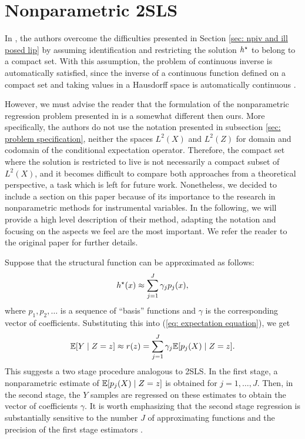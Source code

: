 \section{Nonparametric 2SLS}

In \cite{newey2003}, the authors overcome the difficulties presented in Section \ref{sec: npiv and ill posed lip} by assuming identification and restricting the solution $ h^{ \star } $ to belong to a compact set.
With this assumption, the problem of continuous inverse is automatically satisfied, since the inverse of a continuous function defined on a compact set and taking values in a Hausdorff space is automatically continuous \cite{munkres2000}.

However, we must advise the reader that the formulation of the nonparametric regression problem presented in \cite{newey2003} is a somewhat different then ours.
More specifically, the authors do not use the notation presented in subsection \ref{sec: problem specification}, neither the spaces $ L^2 ( X ) $ and $ L^2 ( Z ) $ for domain and codomain of the conditional expectation operator.
Therefore, the compact set where the solution is restricted to live is not necessarily a compact subset of $ L^{ 2 } ( X ) $, and it becomes difficult to compare both approaches from a theoretical perspective, a task which is left for future work.
Nonetheless, we decided to include a section on this paper because of its importance to the research in nonparametric methods for instrumental variables.
In the following, we will provide a high level description of their method, adapting the notation and focusing on the aspects we feel are the most important.
We refer the reader to the original paper for further details.

Suppose that the structural function can be approximated as follows:
\begin{equation}
    \label{eq: expansion on basis functions}
    h^{ \star } ( x ) \approx \sum_{ j=1 }^{ J } \gamma_{ j } p_{ j } ( x )
,\end{equation}
where $ p_{ 1 }, p_{ 2 }, \dots $ is a sequence of ``basis'' functions and $ \gamma $ is the corresponding vector of coefficients.
Substituting this into (\ref{eq: expectation equation}), we get
\begin{equation}
    \label{eq: projected expansion}
    \mathbb{E} [ Y \mid Z = z ] \approx r ( z ) = \sum_{ j=1 }^{ J } \gamma_{ j } \mathbb{E} [ p_{ j } ( X ) \mid Z = z ]
.\end{equation}
This suggests a two stage procedure analogous to 2SLS.
In the first stage, a nonparametric estimate of $ \mathbb{E} [ p_{ j } ( X ) \mid Z = z ] $ is obtained for $ j = 1, \dots, J $.
Then, in the second stage, the $ Y $ samples are regressed on these estimates to obtain the vector of coefficients $ \gamma $.
It is worth emphasizing that the second stage regression is substantially sensitive to the number $ J $ of approximating functions and the precision of the first stage estimators \cite{newey2003}.

